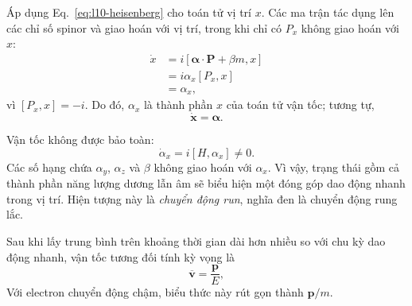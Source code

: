 Áp dụng Eq.~\eqref{eq:l10-heisenberg} cho toán tử vị trí \(x\). Các ma trận tác dụng lên các chỉ số spinor và giao hoán với vị trí, trong khi chỉ có \(P_x\) không giao hoán với \(x\):
\begin{align}
\dot x
&=i[\boldsymbol{\alpha}\cdot\mathbf P+\beta m,x]\\
&=i\alpha_x[P_x,x]\\
&=\alpha_x,
\label{eq:l10-velocity}
\end{align}
vì \([P_x,x]=-i\). Do đó, \(\alpha_x\) là thành phần \(x\) của toán tử vận tốc; tương tự,
\begin{equation}
\dot{\mathbf x}=\boldsymbol{\alpha}.
\end{equation}

\begin{classroomqa}
\end{classroomqa}

Vận tốc không được bảo toàn:
\begin{equation}
\dot\alpha_x=i[H,\alpha_x]\ne0.
\end{equation}
Các số hạng chứa \(\alpha_y\), \(\alpha_z\) và \(\beta\) không giao hoán với \(\alpha_x\). Vì vậy, trạng thái gồm cả thành phần năng lượng dương lẫn âm sẽ biểu hiện một đóng góp dao động nhanh trong vị trí. Hiện tượng này là \emph{chuyển động run}, nghĩa đen là chuyển động rung lắc.

Sau khi lấy trung bình trên khoảng thời gian dài hơn nhiều so với chu kỳ dao động nhanh, vận tốc tương đối tính kỳ vọng là
\begin{equation}
\overline{\mathbf v}=\frac{\mathbf p}{E},
\end{equation}
Với electron chuyển động chậm, biểu thức này rút gọn thành \(\mathbf p/m\).

\begin{classroomqa}
\end{classroomqa}

